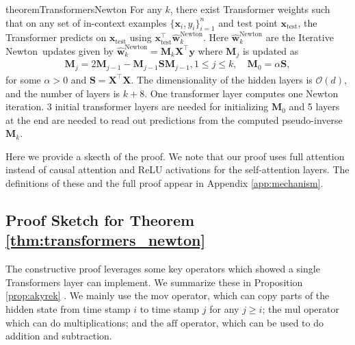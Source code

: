 \documentclass[11pt]{article}
\theoremstyle{plain}
\theoremstyle{definition}
\theoremstyle{remark}
\renewcommand{\^}[1]{^{(#1)}}
\newcommand{\bx}{\boldsymbol{x}}
\newcommand{\bX}{\boldsymbol{X}}
\newcommand{\bM}{\boldsymbol{M}}
\newcommand{\by}{\boldsymbol{y}}
\newcommand{\bS}{\boldsymbol{S}}
\newcommand{\bw}{\boldsymbol{w}}
\newcommand{\newton}{Iterative Newton}
\begin{document}
\begin{restatable}{theorem}{TransformersNewton}
\label{thm:transformers_newton}
For any $k$, there exist Transformer weights such that on any set of in-context examples  $\{\bx_i, y_i\}_{i=1}^n$ and test point  $\bx_\mathrm{test}$, the Transformer predicts on $\bx_\mathrm{test}$ using $\bx_\mathrm{test}^\top \hat{\bw}^\mathrm{Newton}_{k}$. Here $\hat{\bw}^\mathrm{Newton}_{k}$ are the \newton\ updates given by $ \hat{\bw}^\mathrm{Newton}_{k} =  \bM_{k}  \bX^\top \by$ where $\bM_{j}$ is updated as 
\begin{align*}
    \bM_{j} = 2 \bM_{j-1} - \bM_{j-1} \bS \bM_{j-1}, 1\le j\le k, \quad  \bM_{0}=\alpha \bS, 
\end{align*}
for some $\alpha>0$ and  $\bS = \bX^\top \bX$. The dimensionality of the hidden layers is $\mathcal{O}(d)$, and the number of layers is $k+8$. One transformer layer computes one Newton iteration. 3 initial transformer layers are needed for initializing $\bM_0$ and 5 layers at the end are needed to read out predictions from the computed pseudo-inverse $\bM_k$.
\end{restatable}

Here we provide a skecth of the proof. 
We note that our proof uses full attention instead of causal attention and ReLU activations for the self-attention layers. The definitions of these and the full proof appear in Appendix \ref{app:mechanism}.

\subsection{Proof Sketch for Theorem \ref{thm:transformers_newton}}
The constructive proof leverages some key operators which \cite{Akyrek2022WhatLA} showed  a single Transformers layer can implement. We summarize these in Proposition \ref{prop:akyrek} . We mainly use the $\mathrm{mov}$ operator, which can copy parts of the hidden state from time stamp $i$ to time stamp $j$ for any $j \geq i$; the $\mathrm{mul}$ operator which can do multiplications; and the $\mathrm{aff}$ operator, which can be used to do addition and subtraction. 
\end{document}
